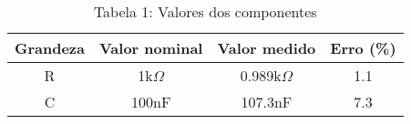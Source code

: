 \vspace{5pt}
\begin{table}[h]
\centering
\begin{tabular}{|c|c|c|c|}
\hline
\textbf{Grandeza} & \textbf{Valor nominal} & \textbf{Valor medido} & \textbf{Erro (\%) }\\\hline
R & 1k$\Omega$ & 0.989k$\Omega$ & 1.1 \\\hline
C & 100nF & 107.3nF & 7.3 \\\hline
\end{tabular}
\caption*{Tabela 1: Valores dos componentes}
\end{table}